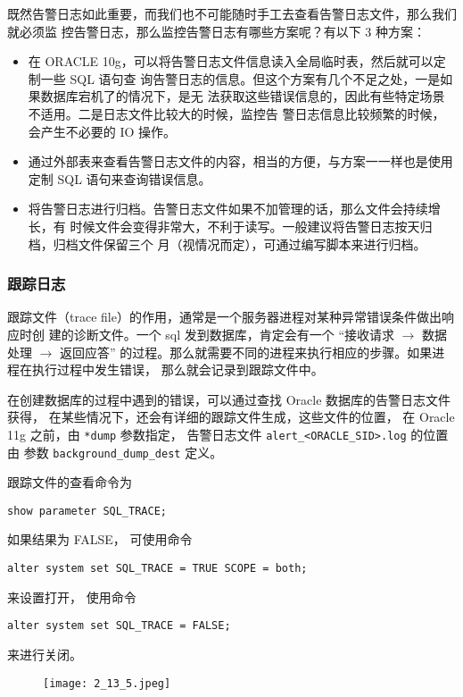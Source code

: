 既然告警日志如此重要，而我们也不可能随时手工去查看告警日志文件，那么我们就必须监
控告警日志，那么监控告警日志有哪些方案呢？有以下 3 种方案：
\begin{itemize}
  \item 在 ORACLE 10g，可以将告警日志文件信息读入全局临时表，然后就可以定制一些 SQL 语句查
    询告警日志的信息。但这个方案有几个不足之处，一是如果数据库宕机了的情况下，是无
    法获取这些错误信息的，因此有些特定场景不适用。二是日志文件比较大的时候，监控告
    警日志信息比较频繁的时候，会产生不必要的 IO 操作。
  \item 通过外部表来查看告警日志文件的内容，相当的方便，与方案一一样也是使用定制
    SQL 语句来查询错误信息。
  \item 将告警日志进行归档。告警日志文件如果不加管理的话，那么文件会持续增长，有
    时候文件会变得非常大，不利于读写。一般建议将告警日志按天归档，归档文件保留三个
    月（视情况而定），可通过编写脚本来进行归档。
\end{itemize}
%
\subsubsection{跟踪日志}
跟踪文件（trace file）的作用，通常是一个服务器进程对某种异常错误条件做出响应时创
建的诊断文件。一个 sql 发到数据库，肯定会有一个
``接收请求 $\rightarrow$ 数据处理 $\rightarrow$ 返回应答''
的过程。那么就需要不同的进程来执行相应的步骤。如果进程在执行过程中发生错误，
那么就会记录到跟踪文件中。

在创建数据库的过程中遇到的错误，可以通过查找 Oracle 数据库的告警日志文件获得，
在某些情况下，还会有详细的跟踪文件生成，这些文件的位置，
在 Oracle 11g 之前，由 \texttt{*dump} 参数指定，
告警日志文件 \texttt{alert\_<ORACLE\_SID>.log} 的位置由
参数 \texttt{background\_dump\_dest} 定义。

跟踪文件的查看命令为
\begin{verbatim}
show parameter SQL_TRACE;
\end{verbatim}
如果结果为 FALSE，
可使用命令
\begin{verbatim}
alter system set SQL_TRACE = TRUE SCOPE = both;
\end{verbatim}
来设置打开，
使用命令
\begin{verbatim}
alter system set SQL_TRACE = FALSE;
\end{verbatim}
来进行关闭。
\begin{figure}[H]
  \begin{center}
    \texttt{[image: 2\_13\_5.jpeg]}
  \end{center}
\end{figure}


